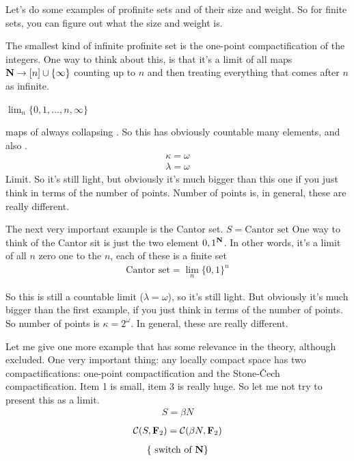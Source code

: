 \begin{example}
Let's do some examples of profinite sets and of their size and weight. 
So for finite sets, you can figure out what the size and weight is.

The smallest kind of infinite profinite set is the one-point compactification of the integers. One way to think about this, is that it's a limit of all maps $\mathbf N \to [n] \cup \{\infty\}$ counting up to $n$ and then treating everything that comes after $n$ as infinite.

$\lim_{n} \{ 0, 1, \dots, n, \infty \} $

maps of always collapsing .
So this has obviously countable many elements, and also .
\begin{align*}
\kappa = \omega
\end{align*} 
\begin{align*}
\lambda = \omega
\end{align*}
Limit. So it's still light, but obviously it's much bigger than this one if you just think in terms of the number of points. Number of points is, in general, these are really different.

\item The next very important example is the Cantor set.
$S = \text{Cantor set}$
One way to think of the Cantor sit is just the two element ${0, 1}^{\mathbf N}$. In other words, it's a limit of all $n$ zero one to the $n$, each of these is a finite set
\begin{align*}
\text{Cantor set} = \lim_{n} \{ 0,1 \}^n 
\end{align*}

So this is still a countable limit ($\lambda = \omega$), so it's still light. But obviously it's much bigger than the first example, if you just think in terms of the number of points. So number of points is $\kappa = 2^\omega$. In general, these are really different.

\item Let me give one more example that has some relevance in the theory, although excluded. One very important thing: any locally compact space has two compactifications: one-point compactification and the Stone-Čech compactification. Item 1 is small, item 3 is really huge. So let me not try to present this as a limit.
\begin{align*}
S = \beta N
\end{align*}
\begin{align*}
\mathcal{C}(S, \mathbf F_2) = \mathcal{C}(\beta N, \mathbf F_2)
\end{align*}
\begin{align*}
\{ \text{ switch of } \mathbf N \}
\end{align*}


\end{example}
